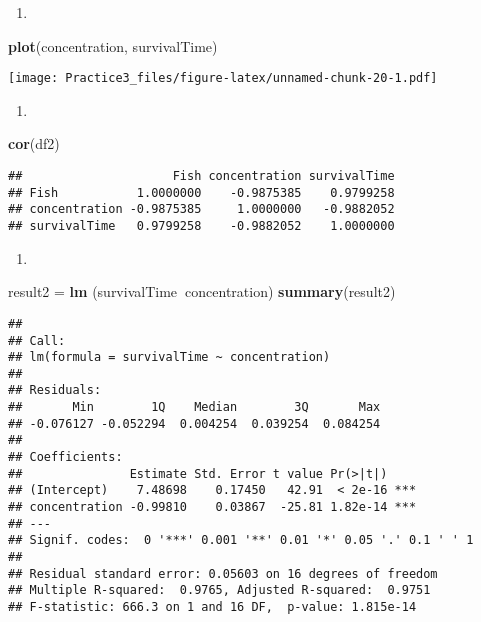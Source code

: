 \documentclass[
]{article}
\newenvironment{Shaded}{\begin{snugshade}}{\end{snugshade}}
\newcommand{\KeywordTok}[1]{\textcolor[rgb]{0.13,0.29,0.53}{\textbf{#1}}}
\newcommand{\NormalTok}[1]{#1}
\newcommand{\OperatorTok}[1]{\textcolor[rgb]{0.81,0.36,0.00}{\textbf{#1}}}
\newcommand{\StringTok}[1]{\textcolor[rgb]{0.31,0.60,0.02}{#1}}
\begin{document}
\begin{enumerate}
\def\labelenumi{(\alph{enumi})}
\item
\end{enumerate}

\begin{Shaded}
\begin{Highlighting}[]
\KeywordTok{plot}\NormalTok{(concentration, survivalTime)}
\end{Highlighting}
\end{Shaded}

\texttt{[image: Practice3\_files/figure-latex/unnamed-chunk-20-1.pdf]}

\begin{enumerate}
\def\labelenumi{(\alph{enumi})}
\setcounter{enumi}{1}
\item
\end{enumerate}

\begin{Shaded}
\begin{Highlighting}[]
\KeywordTok{cor}\NormalTok{(df2)}
\end{Highlighting}
\end{Shaded}

\begin{verbatim}
##                     Fish concentration survivalTime
## Fish           1.0000000    -0.9875385    0.9799258
## concentration -0.9875385     1.0000000   -0.9882052
## survivalTime   0.9799258    -0.9882052    1.0000000
\end{verbatim}

\begin{enumerate}
\def\labelenumi{(\alph{enumi})}
\setcounter{enumi}{2}
\item
\end{enumerate}

\begin{Shaded}
\begin{Highlighting}[]
\NormalTok{result2 =}\StringTok{ }\KeywordTok{lm}\NormalTok{ (survivalTime}\OperatorTok{~}\NormalTok{concentration)}
\KeywordTok{summary}\NormalTok{(result2)}
\end{Highlighting}
\end{Shaded}

\begin{verbatim}
## 
## Call:
## lm(formula = survivalTime ~ concentration)
## 
## Residuals:
##       Min        1Q    Median        3Q       Max 
## -0.076127 -0.052294  0.004254  0.039254  0.084254 
## 
## Coefficients:
##               Estimate Std. Error t value Pr(>|t|)    
## (Intercept)    7.48698    0.17450   42.91  < 2e-16 ***
## concentration -0.99810    0.03867  -25.81 1.82e-14 ***
## ---
## Signif. codes:  0 '***' 0.001 '**' 0.01 '*' 0.05 '.' 0.1 ' ' 1
## 
## Residual standard error: 0.05603 on 16 degrees of freedom
## Multiple R-squared:  0.9765, Adjusted R-squared:  0.9751 
## F-statistic: 666.3 on 1 and 16 DF,  p-value: 1.815e-14
\end{verbatim}
\end{document}
